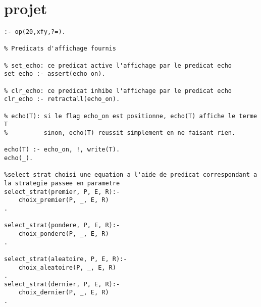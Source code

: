 \documentclass[10pt,a4paper]{report}
\begin{document}
\section{projet}
\begin{lstlisting}[caption ={le fichier projet.pl}]
:- op(20,xfy,?=).

% Predicats d'affichage fournis

% set_echo: ce predicat active l'affichage par le predicat echo
set_echo :- assert(echo_on).

% clr_echo: ce predicat inhibe l'affichage par le predicat echo
clr_echo :- retractall(echo_on).

% echo(T): si le flag echo_on est positionne, echo(T) affiche le terme T
%          sinon, echo(T) reussit simplement en ne faisant rien.

echo(T) :- echo_on, !, write(T).
echo(_). 

%select_strat choisi une equation a l'aide de predicat correspondant a la strategie passee en parametre 
select_strat(premier, P, E, R):-
	choix_premier(P, _, E, R)
.

select_strat(pondere, P, E, R):-
	choix_pondere(P, _, E, R)
.

select_strat(aleatoire, P, E, R):-
	choix_aleatoire(P, _, E, R)
.
select_strat(dernier, P, E, R):-
	choix_dernier(P, _, E, R)
.


\end{lstlisting}
\end{document}
